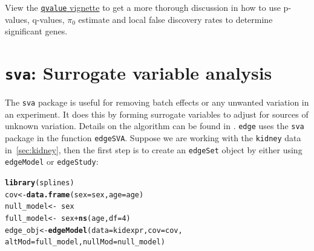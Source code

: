 \documentclass{article}\usepackage[]{graphicx}\usepackage[]{color}
\makeatletter
\newcommand{\hlnum}[1]{\textcolor[rgb]{0.686,0.059,0.569}{#1}}%
\newcommand{\hlopt}[1]{\textcolor[rgb]{0,0,0}{#1}}%
\newcommand{\hlstd}[1]{\textcolor[rgb]{0.345,0.345,0.345}{#1}}%
\newcommand{\hlkwb}[1]{\textcolor[rgb]{0.69,0.353,0.396}{#1}}%
\newcommand{\hlkwc}[1]{\textcolor[rgb]{0.333,0.667,0.333}{#1}}%
\newcommand{\hlkwd}[1]{\textcolor[rgb]{0.737,0.353,0.396}{\textbf{#1}}}%
\newenvironment{kframe}{%
 \def\at@end@of@kframe{}%
 \ifinner\ifhmode%
  \def\at@end@of@kframe{\end{minipage}}%
  \begin{minipage}{\columnwidth}%
 \fi\fi%
 \def\FrameCommand##1{\hskip\@totalleftmargin \hskip-\fboxsep
 \colorbox{shadecolor}{##1}\hskip-\fboxsep
     \hskip-\linewidth \hskip-\@totalleftmargin \hskip\columnwidth}%
 \MakeFramed {\advance\hsize-\width
   \@totalleftmargin\z@ \linewidth\hsize
   \@setminipage}}%
 {\par\unskip\endMakeFramed%
 \at@end@of@kframe}
\newenvironment{knitrout}{}{} %
\makeatother
\begin{document}
View the \href{http://www.bioconductor.org/packages/release/bioc/html/qvalue.html}{{\tt qvalue} vignette} to get a more thorough discussion in how to use p-values, q-values, $\pi_{0}$ estimate and local false discovery rates to determine significant genes.

\section{{\tt sva}: Surrogate variable analysis}
\label{sec:SVA}
The {\tt sva} package is useful for removing batch effects or any unwanted variation in an experiment. It does this by forming surrogate variables to adjust for sources of unknown variation. Details on the algorithm can be found in \cite{leek:2007}. {\tt edge} uses the {\tt sva} package in the function {\tt edgeSVA}. Suppose we are working with the {\tt kidney} data in~\ref{sec:kidney}, then the first step is to create an {\tt edgeSet} object by either using {\tt edgeModel} or {\tt edgeStudy}:
\begin{knitrout}
\color{fgcolor}\begin{kframe}
\begin{alltt}
\hlkwd{library}\hlstd{(splines)}
\hlstd{cov} \hlkwb{<-} \hlkwd{data.frame}\hlstd{(}\hlkwc{sex} \hlstd{= sex,} \hlkwc{age} \hlstd{= age)}
\hlstd{null_model} \hlkwb{<-} \hlopt{~}\hlstd{sex}
\hlstd{full_model} \hlkwb{<-} \hlopt{~}\hlstd{sex} \hlopt{+} \hlkwd{ns}\hlstd{(age,} \hlkwc{df} \hlstd{=} \hlnum{4}\hlstd{)}
\hlstd{edge_obj} \hlkwb{<-} \hlkwd{edgeModel}\hlstd{(}\hlkwc{data} \hlstd{= kidexpr,} \hlkwc{cov} \hlstd{= cov,}
    \hlkwc{altMod} \hlstd{= full_model,} \hlkwc{nullMod} \hlstd{= null_model)}
\end{alltt}
\end{kframe}
\end{knitrout}
\end{document}
